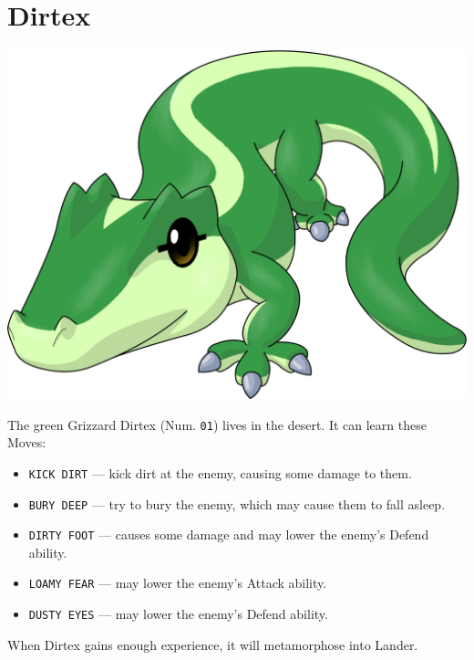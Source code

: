 \documentclass[9pt,twocolumn,openany,article]{memoir}
\newenvironment{ritemize}{\begin{itemize}\raggedright}{\end{itemize}}
\newcommand\englishskip{\vspace{14pt}}
\begin{document}


\ifdefined\DEMO\else

\pagebreak

\section{Dirtex}

\begin{center}
  \englishskip
  \includegraphics[width=.8\columnwidth]{../Manual/Dirtex.png}
  \englishskip
\end{center}

\noindent{}The  green Grizzard  Dirtex (Num.  \texttt{01}) lives  in the
desert. It can learn these Moves:

\begin{ritemize}
\item \texttt{KICK DIRT} --- kick dirt at the enemy, causing some damage
  to them.
\item \texttt{BURY DEEP} --- try to bury the enemy, which may cause them
  to fall asleep.
\item  \texttt{DIRTY FOOT}  --- causes  some  damage and  may lower  the
  enemy's Defend ability.
\item \texttt{LOAMY FEAR} --- may lower the enemy's Attack ability.
\item \texttt{DUSTY EYES} --- may lower the enemy's Defend ability.
\end{ritemize}

When Dirtex gains enough experience, it will metamorphose into Lander.
\end{document}
